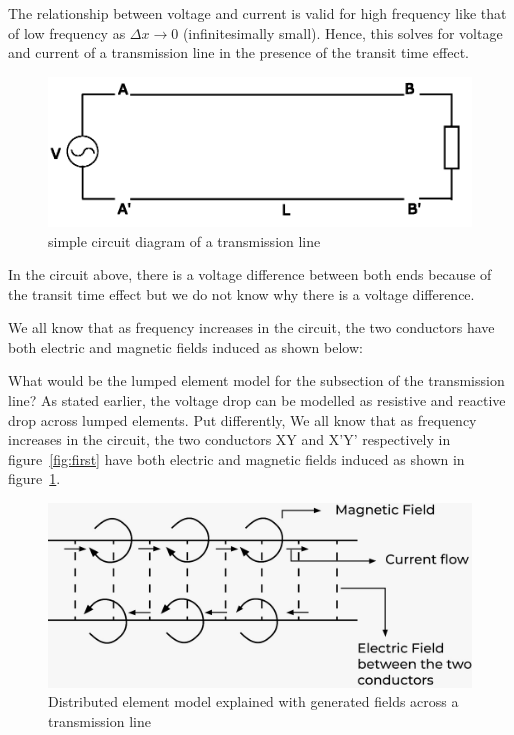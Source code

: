The relationship between voltage and current is valid for high frequency like that of low frequency as $ \Delta x  \rightarrow 0$ (infinitesimally small). Hence, this solves for voltage and current of a transmission line in the presence of the transit time effect.
\begin{figure}[h]
\centering
\includegraphics[width=1\linewidth]{./graphics/second fixed}
\caption{simple circuit diagram of a transmission line}
\end{figure}	

In the circuit above, there is a voltage difference between both ends because of the transit time effect but we do not know why there is a voltage difference.

We all know that as frequency increases in the circuit, the two conductors have both electric and magnetic fields induced as shown below: 

What would be the lumped element model for the subsection of the transmission line? As stated earlier, the voltage drop can be modelled as resistive and reactive drop across lumped elements. Put differently, We all know that as frequency increases in the circuit, the two conductors XY and X'Y' respectively in figure~\ref{fig:first} have both electric and magnetic fields induced as shown in figure~\ref{fig:third}.
\begin{figure}[h]
\centering
\includegraphics[width=1\linewidth]{./graphics/fieldsTx}
\caption{Distributed element model explained with generated fields across a transmission line}
\label{fig:third}
\end{figure}

